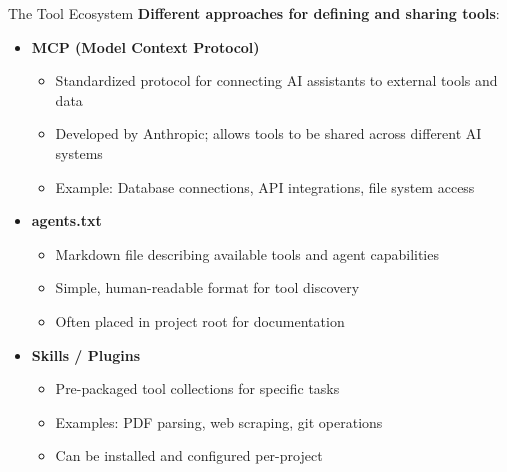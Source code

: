 \documentclass[aspectratio=169]{beamer}
\begin{document}
\begin{frame}{The Tool Ecosystem}
\textbf{Different approaches for defining and sharing tools}:
\vspace{0.3cm}

\begin{itemize}
    \item \textbf{MCP (Model Context Protocol)}
    \begin{itemize}
        \item Standardized protocol for connecting AI assistants to external tools and data
        \item Developed by Anthropic; allows tools to be shared across different AI systems
        \item Example: Database connections, API integrations, file system access
    \end{itemize}
    \vspace{0.2cm}

    \item \textbf{agents.txt}
    \begin{itemize}
        \item Markdown file describing available tools and agent capabilities
        \item Simple, human-readable format for tool discovery
        \item Often placed in project root for documentation
    \end{itemize}
    \vspace{0.2cm}

    \item \textbf{Skills / Plugins}
    \begin{itemize}
        \item Pre-packaged tool collections for specific tasks
        \item Examples: PDF parsing, web scraping, git operations
        \item Can be installed and configured per-project
    \end{itemize}
\end{itemize}
\end{frame}
\end{document}

